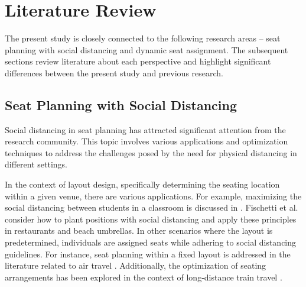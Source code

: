 \section{Literature Review}
The present study is closely connected to the following research areas -- seat planning with social distancing and dynamic seat assignment. The subsequent sections review literature about each perspective and highlight significant differences between the present study and previous research.







\subsection{Seat Planning with Social Distancing}
Social distancing in seat planning has attracted significant attention from the research community. This topic involves various applications and optimization techniques to address the challenges posed by the need for physical distancing in different settings. 


In the context of layout design, specifically determining the seating location within a given venue, there are various applications. For example, maximizing the social distancing between students in a classroom is discussed in \cite{bortolete2022support}. Fischetti et al.\cite{fischetti2023safe} consider how to plant positions with social distancing and apply these principles in restaurants and beach umbrellas. In other scenarios where the layout is predetermined, individuals are assigned seats while adhering to social distancing guidelines. For instance, seat planning within a fixed layout is addressed in the literature related to air travel \cite{ghorbani2020model, salari2022social}. Additionally, the optimization of seating arrangements has been explored in the context of long-distance train travel \cite{haque2022optimization}.


